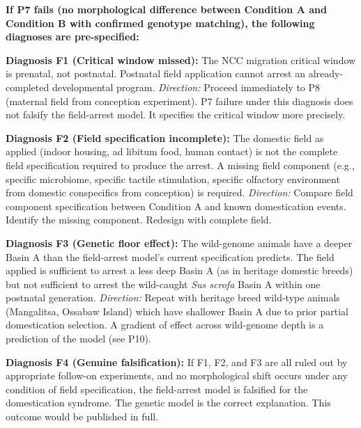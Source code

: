 \documentclass[10pt, a4paper]{article}
\begin{document}
\begin{mdframed}[
  backgroundcolor=failbox,
  linecolor=red!50!black,
  linewidth=0.8pt,
  innertopmargin=0.5em,
  innerbottommargin=0.5em,
  innerleftmargin=0.8em,
  innerrightmargin=0.8em
]
\textbf{If P7 fails (no morphological difference
between Condition A and Condition B with
confirmed genotype matching), the following
diagnoses are pre-specified:}

\medskip
\textbf{Diagnosis F1 (Critical window missed):}
The NCC migration critical window is prenatal,
not postnatal. Postnatal field application
cannot arrest an already-completed developmental
program.
\textit{Direction:} Proceed immediately to P8
(maternal field from conception experiment).
P7 failure under this diagnosis does not
falsify the field-arrest model. It specifies
the critical window more precisely.

\medskip
\textbf{Diagnosis F2 (Field specification
incomplete):}
The domestic field as applied (indoor housing,
ad libitum food, human contact) is not the
complete field specification required to produce
the arrest. A missing field component (e.g.,
specific microbiome, specific tactile stimulation,
specific olfactory environment from domestic
conspecifics from conception) is required.
\textit{Direction:} Compare field component
specification between Condition A and known
domestication events. Identify the missing
component. Redesign with complete field.

\medskip
\textbf{Diagnosis F3 (Genetic floor effect):}
The wild-genome animals have a deeper Basin A
than the field-arrest model's current
specification predicts. The field applied is
sufficient to arrest a less deep Basin A
(as in heritage domestic breeds) but not
sufficient to arrest the wild-caught
\textit{Sus scrofa} Basin A within one
postnatal generation.
\textit{Direction:} Repeat with heritage
breed wild-type animals (Mangalitsa, Ossabaw
Island) which have shallower Basin A due to
prior partial domestication selection. A
gradient of effect across wild-genome depth
is a prediction of the model (see P10).

\medskip
\textbf{Diagnosis F4 (Genuine falsification):}
If F1, F2, and F3 are all ruled out by
appropriate follow-on experiments, and no
morphological shift occurs under any condition
of field specification, the field-arrest model
is falsified for the domestication syndrome.
The genetic model is the correct explanation.
This outcome would be published in full.
\end{mdframed}
\end{document}
